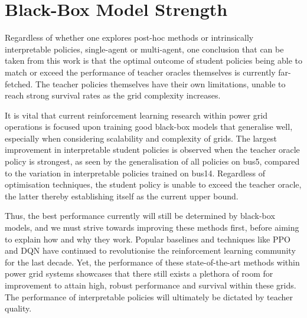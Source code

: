 
\section{Black-Box Model Strength}


Regardless of whether one explores post-hoc methods or intrinsically interpretable policies, single-agent or multi-agent, one conclusion that can be taken from this work is that the optimal outcome of student policies being able to match or exceed the performance of teacher oracles themselves is currently far-fetched. The teacher policies themselves have their own limitations, unable to reach strong survival rates as the grid complexity increases. 

It is vital that current reinforcement learning research within power grid operations is focused upon training good black-box models that generalise well, especially when considering scalability and complexity of grids. The largest improvement in interpretable student policies is observed when the teacher oracle policy is strongest, as seen by the generalisation of all policies on bus5, compared to the variation in interpretable policies trained on bus14. Regardless of optimisation techniques, the student policy is unable to exceed the teacher oracle, the latter thereby establishing itself as the current upper bound. 

Thus, the best performance currently will still be determined by black-box models, and we must strive towards improving these methods first, before aiming to explain how and why they work. Popular baselines and techniques like PPO and DQN have continued to revolutionise the reinforcement learning community for the last decade. Yet, the performance of these state-of-the-art methods within power grid systems showcases that there still exists a plethora of room for improvement to attain high, robust performance and survival within these grids. The performance of interpretable policies will ultimately be dictated by teacher quality.



